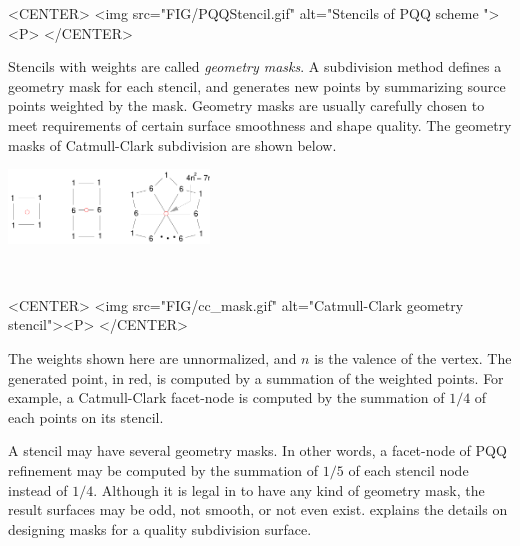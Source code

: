\begin{ccHtmlOnly}
  <CENTER>
     <img src="FIG/PQQStencil.gif" alt="Stencils of PQQ scheme "><P>
  </CENTER>
\end{ccHtmlOnly}


Stencils with weights are called \emph{geometry masks}.
A subdivision method defines a geometry mask for each stencil, and 
generates new points by summarizing source points weighted by the mask.
Geometry masks are usually carefully chosen to meet requirements of 
certain surface smoothness and shape quality.
The geometry masks of Catmull-Clark subdivision are shown
below.  

\begin{ccTexOnly}
  \begin{center}
    \parbox{0.4\textwidth}{%
      \includegraphics[width=0.4\textwidth]{Subdivision_method_3/FIG/cc_mask}%
    } \\ \vspace{0.5cm}
  \end{center}
\end{ccTexOnly}

\begin{ccHtmlOnly}
  <CENTER>
     <img src="FIG/cc_mask.gif" alt="Catmull-Clark geometry stencil"><P>
  </CENTER>
\end{ccHtmlOnly}

The weights shown here are unnormalized, and $n$ is the valence 
of the vertex. The generated point, in red, is computed by a summation
of the weighted points. For example, a Catmull-Clark facet-node is 
computed by the summation of $1/4$ of each points on its stencil.

A stencil may have several geometry masks. In other 
words, a facet-node of PQQ refinement may be computed by 
the summation of $1/5$ of each stencil node instead of $1/4$.
Although it is legal in  to have 
any kind of geometry mask, the result surfaces may be odd, 
not smooth, or not even exist. \cite{cgal:ww-smgd-02} explains the 
details on designing masks for a quality subdivision surface.


